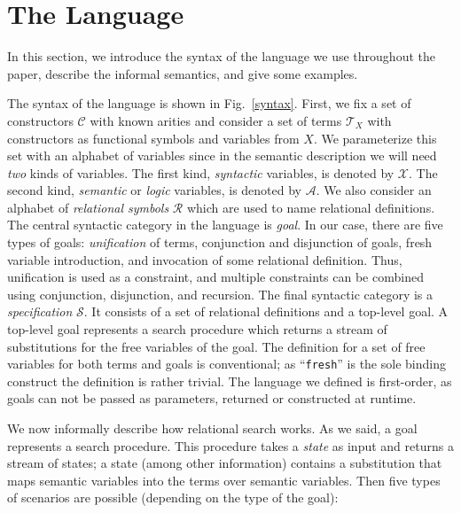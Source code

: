 \section{The Language}
\label{language}
 
In this section, we introduce the syntax of the language we use throughout the paper, describe the informal semantics, and give some examples.

The syntax of the language is shown in Fig.~\ref{syntax}. First, we fix a set of constructors $\mathcal{C}$ with known arities and consider
a set of terms $\mathcal{T}_X$ with constructors as functional symbols and variables from $X$. We parameterize this set with an alphabet of
variables since in the semantic description we will need \emph{two} kinds of variables. The first kind, \emph{syntactic} variables, is denoted
by $\mathcal{X}$. The second kind, \emph{semantic} or \emph{logic} variables, is denoted by $\mathcal{A}$.
We also consider an alphabet of \emph{relational symbols} $\mathcal{R}$ which are used to name relational definitions.
The central syntactic category in the language is \emph{goal}. In our case, there are five types of goals: \emph{unification} of terms,
conjunction and disjunction of goals, fresh variable introduction, and invocation of some relational definition. Thus, unification is used
as a constraint, and multiple constraints can be combined using conjunction, disjunction, and recursion.
The final syntactic category is a \emph{specification} $\mathcal{S}$. It consists of a set
of relational definitions and a top-level goal. A top-level goal represents a search procedure which returns a stream of substitutions for
the free variables of the goal. The definition for a set of free variables for both terms and goals is conventional;
as ``\lstinline|fresh|''
is the sole binding construct the definition is rather trivial. The language we defined is first-order, as goals can not be passed as parameters,
returned or constructed at runtime.

We now informally describe how relational search works. As we said, a goal represents a search procedure. This procedure takes a \emph{state} as input and returns a
stream of states; a state (among other information) contains a substitution that maps semantic variables into the terms over semantic variables. Then five types of
scenarios are possible (depending on the type of the goal):

